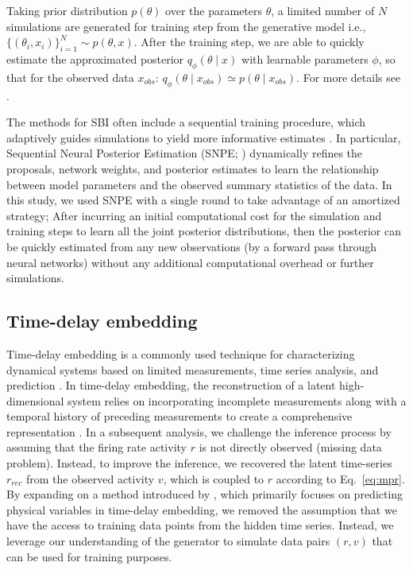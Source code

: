 \documentclass[preprint,11pt,authoryear]{elsarticle}
\begin{document}
Taking prior distribution $p(\theta)$ over the parameters $\theta$, a limited number of $N$ simulations are generated for training step from the generative model i.e.,  $\{(\theta_i, x_i)\}_{i=1}^{N} \sim p(\theta, x)$. After the training step, we are able to quickly estimate the approximated posterior $q_{\phi}(\theta \mid x)$ with learnable parameters $\phi$, so that for the observed data $x_{obs}$: $q_{\phi}(\theta \mid x_{obs}) \simeq p(\theta \mid x_{obs})$. For more details see \cite{Goncalves2020, Hashemi2023}. 

The methods for SBI often include a sequential training procedure, which adaptively guides simulations to yield more informative estimates \citep{Papamakarios2019b, Lueckmann2019, Durkan2020, Wiqvist2021, Deistler2022}. In particular, Sequential Neural Posterior Estimation (SNPE; \cite{Greenberg2019, Goncalves2020})  dynamically refines the proposals, network weights, and posterior estimates to learn the relationship between model parameters and the observed summary statistics of the data. In this study, we used SNPE with a single round to take advantage of an amortized strategy; After incurring an initial computational cost for the simulation and training steps to learn all the joint posterior distributions, then the posterior can be quickly estimated from any new observations (by a forward pass through neural networks)  without any additional computational overhead or further simulations.




\subsection{Time-delay embedding}

Time-delay embedding is a commonly used technique for characterizing dynamical systems based on limited measurements, time series analysis, and prediction \citep{Takens2006}. In time-delay embedding, the reconstruction of a latent high-dimensional system relies on incorporating incomplete measurements along with a temporal history of preceding measurements to create a comprehensive representation \citep{Kennel1992, Hirsh2021}.
In a subsequent analysis, we challenge the inference process by assuming that the firing rate activity $r$ is not directly observed (missing data problem). Instead, to improve the inference, we recovered the latent time-series $r_{rec}$ from the observed activity $v$, which is coupled to $r$ according to Eq.~\ref{eq:mpr}.
By expanding on a method introduced by \cite{Abarbanel}, which primarily focuses on predicting physical variables in time-delay embedding, we removed the assumption that we have the access to training data points from the hidden time series. Instead, we leverage our understanding of the generator to simulate data pairs $(r, v)$ that can be used for training purposes.
\end{document}

